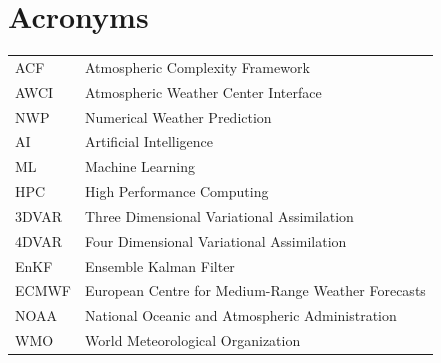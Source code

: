 \chapter*{Acronyms}


\begin{tabular}{ll}

ACF & Atmospheric Complexity Framework \\

AWCI & Atmospheric Weather Center Interface \\

NWP & Numerical Weather Prediction \\

AI & Artificial Intelligence \\

ML & Machine Learning \\

HPC & High Performance Computing \\

3DVAR & Three Dimensional Variational Assimilation \\

4DVAR & Four Dimensional Variational Assimilation \\

EnKF & Ensemble Kalman Filter \\

ECMWF & European Centre for Medium-Range Weather Forecasts \\

NOAA & National Oceanic and Atmospheric Administration \\

WMO & World Meteorological Organization \\

\end{tabular}
